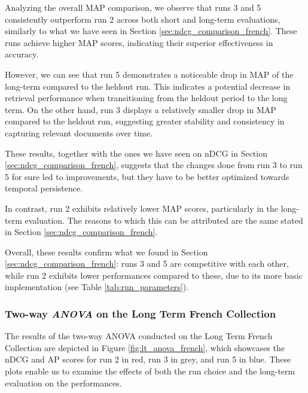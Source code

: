 Analyzing the overall \ac{MAP} comparison, we observe that runs 3 and 5 consistently outperform run 2 across both short and long-term evaluations, similarly to what we have seen in Section \ref{sec:ndcg_comparison_french}.
These runs achieve higher \ac{MAP} scores, indicating their superior effectiveness in accuracy.  

However, we can see that run 5 demonstrates a noticeable drop in \ac{MAP} of the long-term compared to the heldout run. 
This indicates a potential decrease in retrieval performance when transitioning from the heldout period to the long term. 
On the other hand, run 3 displays a relatively smaller drop in \ac{MAP} compared to the heldout run, suggesting greater stability and consistency in capturing relevant documents over time.

These results, together with the ones we have seen on \ac{nDCG} in Section \ref{sec:ndcg_comparison_french}, suggests that the changes done from run 3 to run 5 for sure led to improvements, but they have to be better optimized towards temporal persistence.

In contrast, run 2 exhibits relatively lower \ac{MAP} scores, particularly in the long-term evaluation. The reasons to which this can be attributed are the same stated in Section \ref{sec:ndcg_comparison_french}.

Overall, these results confirm what we found in Section \ref{sec:ndcg_comparison_french}: runs 3 and 5 are competitive with each other, while run 2 exhibits lower performances compared to these, due to its more basic implementation (see Table \ref{tab:run_parameters}). 


\subsubsection{Two-way \textit{ANOVA} on the Long Term French Collection} \label{sec:anova_fr_lt}

The results of the two-way \ac{ANOVA} conducted on the Long Term French Collection are depicted in Figure \ref{fig:lt_anova_french}, which showcases the \ac{nDCG} and \ac{AP} scores for run 2 in red, run 3 in grey, and run 5 in blue. 
These plots enable us to examine the effects of both the run choice and the long-term evaluation on the performances.


